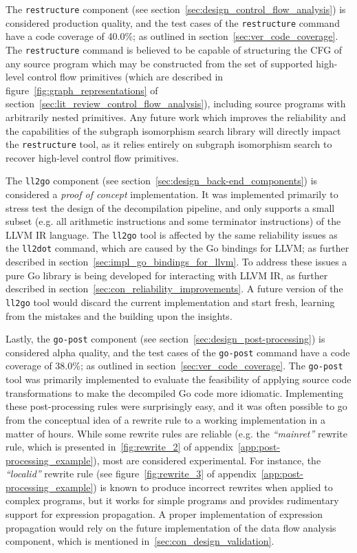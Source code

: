 The \texttt{restructure} component (see section~\ref{sec:design_control_flow_analysis}) is considered production quality, and the test cases of the \texttt{restructure} command have a code coverage of 40.0\%; as outlined in section~\ref{sec:ver_code_coverage}. The \texttt{restructure} command is believed to be capable of structuring the CFG of any source program which may be constructed from the set of supported high-level control flow primitives (which are described in figure~\ref{fig:graph_representations} of section~\ref{sec:lit_review_control_flow_analysis}), including source programs with arbitrarily nested primitives. Any future work which improves the reliability and the capabilities of the subgraph isomorphism search library will directly impact the \texttt{restructure} tool, as it relies entirely on subgraph isomorphism search to recover high-level control flow primitives.

The \texttt{ll2go} component (see section~\ref{sec:design_back-end_components}) is considered a \textit{proof of concept} implementation. It was implemented primarily to stress test the design of the decompilation pipeline, and only supports a small subset (e.g. all arithmetic instructions and some terminator instructions) of the LLVM IR language. The \texttt{ll2go} tool is affected by the same reliability issues as the \texttt{ll2dot} command, which are caused by the Go bindings for LLVM; as further described in section~\ref{sec:impl_go_bindings_for_llvm}. To address these issues a pure Go library is being developed for interacting with LLVM IR, as further described in section~\ref{sec:con_reliability_improvements}. A future version of the \texttt{ll2go} tool would discard the current implementation and start fresh, learning from the mistakes and the building upon the insights.

Lastly, the \texttt{go-post} component (see section~\ref{sec:design_post-processing}) is considered alpha quality, and the test cases of the \texttt{go-post} command have a code coverage of 38.0\%; as outlined in section~\ref{sec:ver_code_coverage}. The \texttt{go-post} tool was primarily implemented to evaluate the feasibility of applying source code transformations to make the decompiled Go code more idiomatic. Implementing these post-processing rules were surprisingly easy, and it was often possible to go from the conceptual idea of a rewrite rule to a working implementation in a matter of hours. While some rewrite rules are reliable (e.g. the \textit{``mainret''} rewrite rule, which is presented in~\ref{fig:rewrite_2} of appendix~\ref{app:post-processing_example}), most are considered experimental. For instance, the \textit{``localid''} rewrite rule (see figure~\ref{fig:rewrite_3} of appendix~\ref{app:post-processing_example}) is known to produce incorrect rewrites when applied to complex programs, but it works for simple programs and provides rudimentary support for expression propagation. A proper implementation of expression propagation would rely on the future implementation of the data flow analysis component, which is mentioned in~\ref{sec:con_design_validation}.





